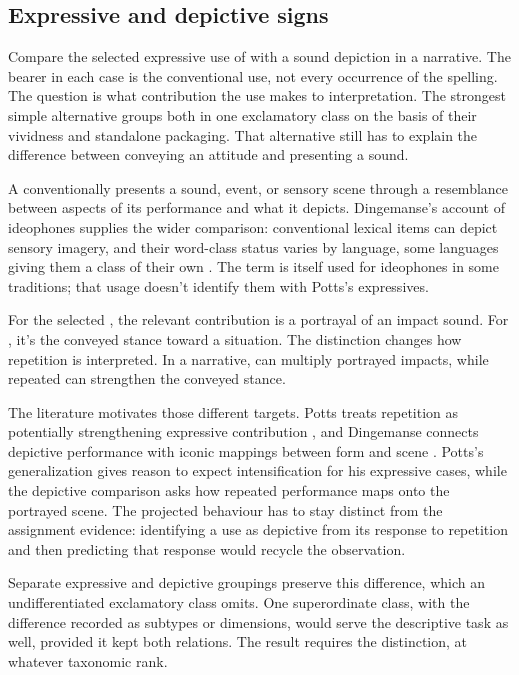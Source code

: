 \documentclass[12pt]{article}
\begin{document}
\subsection{Expressive and depictive signs}\label{sec:expressive-depictive}

Compare the selected expressive use of  with a sound depiction
 in a narrative. The bearer in each case is the conventional
use, not every occurrence of the spelling. The question is what contribution
the use makes to interpretation. The strongest simple alternative groups
both in one exclamatory class on the basis of their vividness and
standalone packaging. That alternative still has to explain the difference
between conveying an attitude and presenting a sound.

A  conventionally presents a sound, event, or sensory
scene through a resemblance between aspects of its performance and what
it depicts. Dingemanse's account of ideophones supplies the wider comparison:
conventional lexical items can depict sensory imagery, and their word-class
status varies by language, some languages giving them a class of their own
\citep[2--3]{dingemanse2018}.
The term  is itself used for ideophones in some traditions;
that usage doesn't identify them with Potts's expressives.

For the selected , the relevant contribution is a portrayal
of an impact sound. For , it's the conveyed stance toward
a situation. The distinction changes how repetition is interpreted. In a
narrative,  can multiply portrayed impacts, while
repeated  can strengthen the conveyed stance.

The literature motivates those different targets. Potts treats repetition
as potentially strengthening expressive contribution \citep[167, 182]{potts2007},
and Dingemanse connects depictive performance with iconic mappings between
form and scene \citep[10--11]{dingemanse2018}. Potts's generalization
gives reason to expect intensification for his expressive cases, while the
depictive comparison asks how repeated performance maps onto the portrayed
scene. The projected behaviour has to stay distinct from the assignment
evidence: identifying a use as depictive from its response to repetition
and then predicting that response would recycle the observation.

Separate expressive and depictive groupings preserve this difference, which
an undifferentiated exclamatory class omits. One superordinate class, with
the difference recorded as subtypes or dimensions, would serve the
descriptive task as well, provided it kept both relations. The result
requires the distinction, at whatever taxonomic rank.
\end{document}
